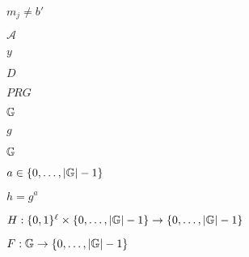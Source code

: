 \documentclass[10pt]{book}
\begin{document}
\begin{mdSnippets}
\begin{mdDisplaySnippet}
\[\begin{aligned}
\end{aligned}
\]%
\end{mdDisplaySnippet}%
\begin{mdInlineSnippet}[2f1ab57505121ac11df6dd272a5e0c76]%
$m_j \neq b'$\end{mdInlineSnippet}%
\begin{mdInlineSnippet}[ad70146b431bea9ae74cf8385470c544]%
$\mathcal{A}$\end{mdInlineSnippet}%
\begin{mdInlineSnippet}[415290769594460e2e485922904f345d]%
$y$\end{mdInlineSnippet}%
\begin{mdInlineSnippet}[f623e75af30e62bbd73d6df5b50bb7b5]%
$D$\end{mdInlineSnippet}%
\begin{mdInlineSnippet}%
$PRG$\end{mdInlineSnippet}%
\begin{mdInlineSnippet}[2a0895c1a5aa2537f0578cd815417471]%
$\mathbb{G}$\end{mdInlineSnippet}%
\begin{mdInlineSnippet}[b2f5ff47436671b6e533d8dc3614845d]%
$g$\end{mdInlineSnippet}%
\begin{mdInlineSnippet}[2a0895c1a5aa2537f0578cd815417471]%
$\mathbb{G}$\end{mdInlineSnippet}%
\begin{mdInlineSnippet}[2dd3cd36e0fea0e4120714b54b1109e1]%
$a\in \{0,\ldots,|\mathbb{G}|-1\}$\end{mdInlineSnippet}%
\begin{mdInlineSnippet}[db8b3bf1a9c14e73f9e6ff0ebdbf00f5]%
$h=g^a$\end{mdInlineSnippet}%
\begin{mdInlineSnippet}%
$H:\{0,1\}^\ell\times \{0,\ldots,|\mathbb{G}|-1\}\rightarrow \{0,\ldots,|\mathbb{G}|-1\}$\end{mdInlineSnippet}%
\begin{mdInlineSnippet}[d86894263c41f938f1959bc549fa24b8]%
$F:\mathbb{G}\rightarrow\{0,\ldots,|\mathbb{G}|-1\}$\end{mdInlineSnippet}%

\end{mdSnippets}
\end{document}
